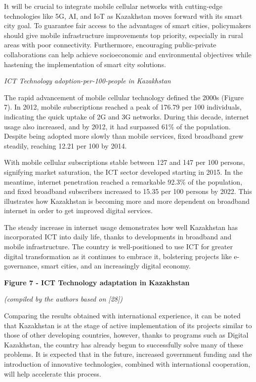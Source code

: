 It will be crucial to integrate mobile cellular networks with
cutting-edge technologies like 5G, AI, and IoT as Kazakhstan moves
forward with its smart city goal. To guarantee fair access to the
advantages of smart cities, policymakers should give mobile
infrastructure improvements top priority, especially in rural areas with
poor connectivity. Furthermore, encouraging public-private
collaborations can help achieve socioeconomic and environmental
objectives while hastening the implementation of smart city solutions.

\emph{ICT Technology adoption-per-100-people in Kazakhstan}

The rapid advancement of mobile cellular technology defined the 2000s
(Figure 7). In 2012, mobile subscriptions reached a peak of 176.79 per
100 individuals, indicating the quick uptake of 2G and 3G networks.
During this decade, internet usage also increased, and by 2012, it had
surpassed 61\% of the population. Despite being adopted more slowly than
mobile services, fixed broadband grew steadily, reaching 12.21 per 100
by 2014.

With mobile cellular subscriptions stable between 127 and 147 per 100
persons, signifying market saturation, the ICT sector developed starting
in 2015. In the meantime, internet penetration reached a remarkable
92.3\% of the population, and fixed broadband subscribers increased to
15.35 per 100 persons by 2022. This illustrates how Kazakhstan is
becoming more and more dependent on broadband internet in order to get
improved digital services.

The steady increase in internet usage demonstrates how well Kazakhstan
has incorporated ICT into daily life, thanks to developments in
broadband and mobile infrastructure. The country is well-positioned to
use ICT for greater digital transformation as it continues to embrace
it, bolstering projects like e-governance, smart cities, and an
increasingly digital economy.

{\bfseries Figure 7 - ICT Technology adaptation in Kazakhstan}

\emph{(compiled by the authors based on {[}28{]})}

Comparing the results obtained with international experience, it can be
noted that Kazakhstan is at the stage of active implementation of its
projects similar to those of other developing countries, however, thanks
to programs such as Digital Kazakhstan, the country has already begun to
successfully solve many of these problems. It is expected that in the
future, increased government funding and the introduction of innovative
technologies, combined with international cooperation, will help
accelerate this process.

